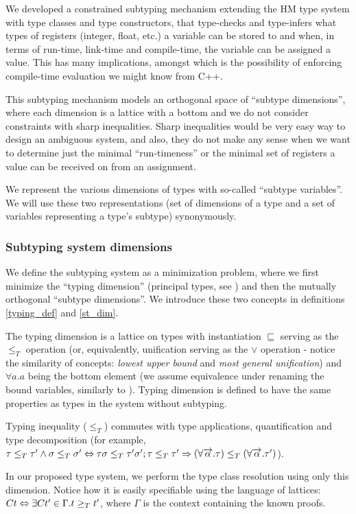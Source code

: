 We developed a constrained subtyping mechanism extending the HM type system with type classes and type constructors, that type-checks and type-infers what types of registers (integer, float, etc.) a variable can be stored to and when, in terms of run-time, link-time and compile-time, the variable can be assigned a value. This has many implications, amongst which is the possibility of enforcing compile-time evaluation we might know from C++.

This subtyping mechanism models an orthogonal space of ``subtype dimensions'', where each dimension is a lattice with a bottom and we do not consider constraints with sharp inequalities. Sharp inequalities would be very easy way to design an ambiguous system, and also, they do not make any sense when we want to determine just the minimal ``run-timeness'' or the minimal set of registers a value can be received on from an assignment.

We represent the various dimensions of types with so-called ``subtype variables''. We will use these two representations (set of dimensions of a type and a set of variables representing a type's subtype) synonymously.

\subsubsection{Subtyping system dimensions}

\begin{defn}
    We define the subtyping system as a minimization problem, where we first minimize the ``typing dimension'' (principal types, see \cite{damas1982principal}) and then the mutually orthogonal ``subtype dimensions''. We introduce these two concepts in definitions \ref{typing_def} and \ref{st_dim}.
\end{defn}

\begin{defn}
    \label{typing_def}
    The typing dimension is a lattice on types with instantiation $\sqsubseteq$ serving as the $\leq_T$ operation (or, equivalently, unification serving as the $\lor$ operation - notice the similarity of concepts: \emph{lowest upper bound} and \emph{most general unification}) and $\forall a . a$ being the bottom element (we assume equivalence under renaming the bound variables, similarly to \cite{barendregt1992lambda}). Typing dimension is defined to have the same properties as types in the system without subtyping.

    Typing inequality ($\leq_T$) commutes with type applications, quantification and type decomposition (for example, $\tau \leq_T \tau' \land \sigma \leq_T \sigma' \Leftrightarrow \tau \sigma \leq_T \tau' \sigma'; \tau \leq_T \tau' \Rightarrow (\forall \overrightarrow{\alpha} . \tau) \leq_T (\forall \overrightarrow{\alpha} . \tau')$).

    In our proposed type system, we perform the type class resolution using only this dimension. Notice how it is easily specifiable using the language of lattices: $C t \Leftrightarrow \exists C t' \in \Gamma . t \geq_T t'$, where $\Gamma$ is the context containing the known proofs.
\end{defn}

